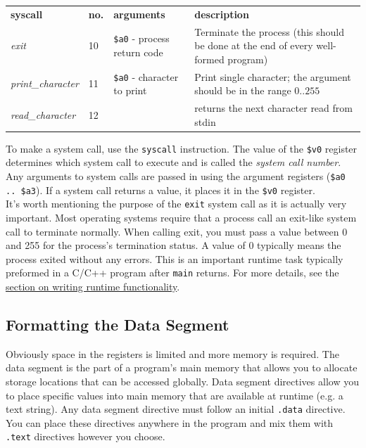 \documentclass[12pt]{article}
\begin{document}
\begin{tabular}{p{} || p{} | p{} | p{}}
    \textbf{syscall} & \textbf{no.} & \textbf{arguments} &
     \textbf{description} \\ \hhline{=#=|=|=}

    \textit{exit} & 10 & \texttt{\$a0} - process return code & Terminate the
     process (this should be done at the end of every well-formed program)
     \\ \hline

    \textit{print\_character} & 11 & \texttt{\$a0} - character to print & Print
     single character; the argument should be in the range $0..255$ \\ \hline

    \textit{read\_character} & 12 & & returns the next character read from stdin\\
\end{tabular}

\vspace{0.25in}
To make a system call, use the \texttt{syscall} instruction. The value of the
     \texttt{\$v0} register determines which system call to execute and is
     called the \textit{system call number}. Any arguments to system calls are
     passed in using the argument registers (\texttt{\$a0 .. \$a3}). If a system
     call returns a value, it places it in the \texttt{\$v0} register.\\

It's worth mentioning the purpose of the \texttt{exit} system call as it is
     actually very important. Most operating systems require that a process call
     an exit-like system call to terminate normally. When calling exit, you must
     pass a value between 0 and 255 for the process's termination status. A
     value of 0 typically means the process exited without any errors. This is
     an important runtime task typically preformed in a C/C++ program after
     \texttt{main} returns. For more details, see the
     \hyperref[sec:runtime]{section on writing runtime functionality}.

\subsection{Formatting the Data Segment}

Obviously space in the registers is limited and more memory is required. The
     data segment is the part of a program's main memory that allows you to
     allocate storage locations that can be accessed globally. Data segment
     directives allow you to place specific values into main memory that are
     available at runtime (e.g. a text string). Any data segment directive must
     follow an initial \texttt{.data} directive. You can place these directives
     anywhere in the program and mix them with \texttt{.text} directives however
     you choose.\\
\end{document}
